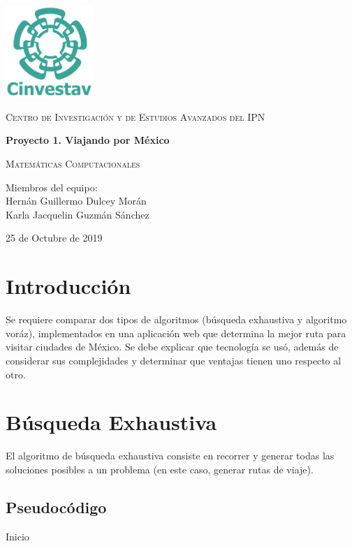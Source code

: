 \documentclass[10pt]{report}
\begin{document}
\begin{titlepage}
	\centering
	\includegraphics[width=0.25\textwidth]{LogoCinvesHeader.png}\par\vspace{2cm}
	{\scshape\LARGE Centro de Investigación y de Estudios Avanzados del IPN\par}
	\vspace{2cm}	
	{\huge\bfseries Proyecto 1. Viajando por México \par}
	\vspace{1.5cm}
	{\scshape\Large Matemáticas Computacionales\par}
	\vspace{2cm}
	{\Large Miembros del equipo: \\Hernán Guillermo Dulcey Morán \\Karla Jacquelin Guzmán Sánchez\par}
	\vfill

	{\large 25 de Octubre de 2019 \par}
\end{titlepage}

\section*{Introducción}
Se requiere comparar dos tipos de algoritmos (búsqueda exhaustiva y algoritmo voráz), implementados en una aplicación web que determina la mejor ruta para visitar ciudades de México. Se debe explicar que tecnología se usó, además de considerar sus complejidades y determinar que ventajas tienen uno respecto al otro.

\section*{Búsqueda Exhaustiva}
El algoritmo de búsqueda exhaustiva consiste en recorrer y generar todas las soluciones posibles a un problema (en este caso, generar rutas de viaje).

\subsection*{Pseudocódigo}
Inicio
\end{document}
